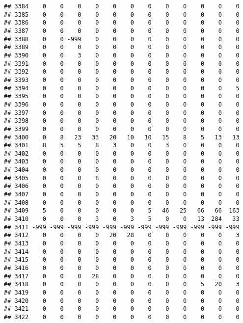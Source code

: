 \documentclass[]{article}
\begin{document}
\begin{verbatim}
## 3384    0    0    0    0    0    0    0    0    0    0    0    0
## 3385    0    0    0    0    0    0    0    0    0    0    0    0
## 3386    0    0    0    0    0    0    0    0    0    0    0    0
## 3387    0    0    0    0    0    0    0    0    0    0    0    0
## 3388    0    0 -999    0    0    0    0    0    0    0    0    0
## 3389    0    0    0    0    0    0    0    0    0    0    0    0
## 3390    0    0    3    0    0    0    0    0    0    0    0    0
## 3391    0    0    0    0    0    0    0    0    0    0    0    0
## 3392    0    0    0    0    0    0    0    0    0    0    0    0
## 3393    0    0    0    0    0    0    0    0    0    0    0    0
## 3394    0    0    0    0    0    0    0    0    0    0    0    5
## 3395    0    0    0    0    0    0    0    0    0    0    0    0
## 3396    0    0    0    0    0    0    0    0    0    0    0    0
## 3397    0    0    0    0    0    0    0    0    0    0    0    0
## 3398    0    0    0    0    0    0    0    0    0    0    0    0
## 3399    0    0    0    0    0    0    0    0    0    0    0    0
## 3400    0    8   23   33   20   10   10   15    8    5   13   13
## 3401    8    5    5    8    3    0    0    3    0    0    0    0
## 3402    0    0    0    0    0    0    0    0    0    0    0    0
## 3403    0    0    0    0    0    0    0    0    0    0    0    0
## 3404    0    0    0    0    0    0    0    0    0    0    0    0
## 3405    0    0    0    8    0    0    0    0    0    0    0    0
## 3406    0    0    0    0    0    0    0    0    0    0    0    0
## 3407    0    0    0    0    0    0    0    0    0    0    0    0
## 3408    0    0    0    0    0    0    0    0    0    0    0    0
## 3409    5    0    0    0    0    0    5   46   25   66   66  163
## 3410    0    0    0    3    0    3    5    0    0   13  284   33
## 3411 -999 -999 -999 -999 -999 -999 -999 -999 -999 -999 -999 -999
## 3412    0    0    0    0   20   28    0    0    0    0    0    3
## 3413    0    0    0    0    0    0    0    0    0    0    0    0
## 3414    0    0    0    0    0    0    0    0    0    0    0    0
## 3415    0    0    0    0    0    0    0    0    0    0    0    0
## 3416    0    0    0    0    0    0    0    0    0    0    0    0
## 3417    0    0    0   28    0    0    0    0    0    0    0    0
## 3418    0    0    0    0    0    0    0    0    0    5   20    3
## 3419    0    0    0    0    0    0    0    0    0    0    0    0
## 3420    0    0    0    0    0    0    0    0    0    0    0    0
## 3421    0    0    0    0    0    0    0    0    0    0    0    0
## 3422    0    0    0    0    0    0    0    0    0    0    0    0

\end{verbatim}
\end{document}
